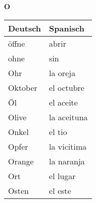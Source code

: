 \begin{flushright}\begin{Huge}\textbf{O}\end{Huge}\end{flushright}

\begin{longtable}{p{} p{}} 
\textbf{Deutsch}     & \textbf{Spanisch}                                       \\ \hline
\hline
\endhead %
öffne & abrir \\
ohne & sin \\
Ohr & la oreja\\
Oktober & el octubre\\
Öl & el aceite\\
Olive & la aceituna\\
Onkel & el tio \\
Opfer & la vicitima\\
Orange & la naranja \\
Ort & el lugar \\
Osten & el este \\

\end{longtable}
